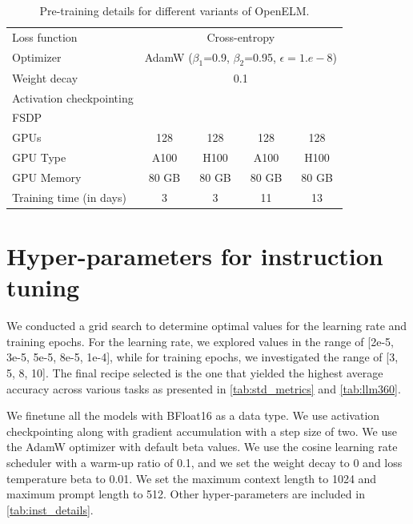 \documentclass[10pt,twocolumn,letterpaper]{article}
\makeatletter
\newcommand{\model}{OpenELM\@\xspace}
\newcommand{\cmark}{\textcolor{yes}{\ding{51}}}%
\newcommand{\xmark}{\textcolor{no}{\ding{55}}}%
\makeatother
\begin{document}
\begin{table}[h!]
{\begin{tabular}{lcccc}
        Loss function & \multicolumn{4}{c}{Cross-entropy} \\
        Optimizer & \multicolumn{4}{c}{AdamW ($\beta_1$=0.9, $\beta_2$=0.95, $\epsilon=1.e-8$)} \\
        Weight decay & \multicolumn{4}{c}{0.1} \\
        \midrule
        Activation checkpointing & \xmark & \cmark & \cmark & \cmark \\
        FSDP & \xmark & \xmark & \xmark & \cmark \\
        GPUs & 128 & 128 & 128 & 128 \\
        GPU Type & A100 & H100 & A100 & H100 \\
        GPU Memory & 80 GB & 80 GB & 80 GB & 80 GB\\
        Training time (in days) & 3 & 3 & 11 & 13\\
        \bottomrule[1.5pt]
    \end{tabular}
    }
    \caption{Pre-training details for different variants of \model.}
    \label{tab:app_lm_arch}
\end{table}

\section{Hyper-parameters for instruction tuning}
\label{sec:app_inst_hyper}

We conducted a grid search to determine optimal values for the learning rate and training epochs. For the learning rate, we explored values in the range of [2e-5, 3e-5, 5e-5, 8e-5, 1e-4], while for training epochs, we investigated the range of [3, 5, 8, 10].  The final recipe selected is the one that yielded the highest average accuracy across various tasks as presented in \cref{tab:std_metrics} and \cref{tab:llm360}. 

We finetune all the models with BFloat16 as a data type. We use activation checkpointing along with gradient accumulation with a step size of two. We use the AdamW optimizer with default beta values. We use the cosine learning rate scheduler with a warm-up ratio of 0.1, and we set the weight decay to 0 and loss temperature beta to 0.01. We set the maximum context length to 1024 and maximum prompt length to 512. Other hyper-parameters are included in \cref{tab:inst_details}.
\end{document}

